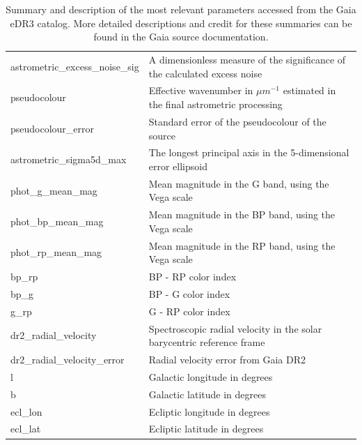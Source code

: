 \documentclass[onecolumn,table,xcdraw,super]{aastex631}
\begin{document}
\begin{table}[]
\begin{tabular}{ll}
astrometric\_excess\_noise\_sig & A dimensionless measure of the significance of the calculated excess noise           \\
pseudocolour                 & Effective wavenumber in $\mu m^{-1}$ estimated in the final astrometric processing             \\
pseudocolour\_error           & Standard error of the pseudocolour of the source            \\
astrometric\_sigma5d\_max      & The longest principal axis in the 5-dimensional error ellipsoid           \\
phot\_g\_mean\_mag              & Mean magnitude in the G band, using the Vega scale            \\
phot\_bp\_mean\_mag             & Mean magnitude in the BP band, using the Vega scale            \\
phot\_rp\_mean\_mag             & Mean magnitude in the RP band, using the Vega scale            \\
bp\_rp                        &  BP - RP color index           \\
bp\_g                         &  BP - G color index           \\
g\_rp                         &  G - RP color index           \\
dr2\_radial\_velocity          & Spectroscopic radial velocity in the solar barycentric reference frame            \\
dr2\_radial\_velocity\_error    & Radial velocity error from Gaia DR2            \\
l                            &  Galactic longitude in degrees           \\
b                            &  Galactic latitude in degrees           \\
ecl\_lon                      & Ecliptic longitude in degrees            \\
ecl\_lat                      & Ecliptic latitude in degrees            \\
\bottomrule
\end{tabular}
\caption{Summary and description of the most relevant parameters accessed from the Gaia eDR3 catalog. More detailed descriptions and credit for these summaries can be found in the Gaia source documentation.}
\end{table}
\end{document}
